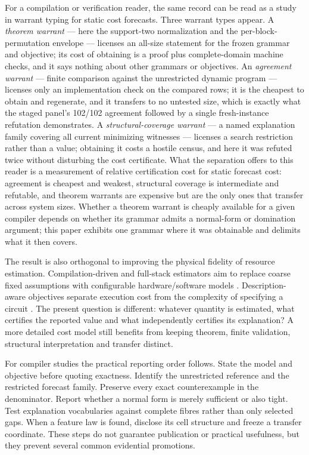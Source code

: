 For a compilation or verification reader, the same record can be read as a study in warrant typing for static cost forecasts.  Three warrant types appear.  A \emph{theorem warrant} --- here the support-two normalization and the per-block-permutation envelope --- licenses an all-size statement for the frozen grammar and objective; its cost of obtaining is a proof plus complete-domain machine checks, and it says nothing about other grammars or objectives.  An \emph{agreement warrant} --- finite comparison against the unrestricted dynamic program --- licenses only an implementation check on the compared rows; it is the cheapest to obtain and regenerate, and it transfers to no untested size, which is exactly what the staged panel's 102/102 agreement followed by a single fresh-instance refutation demonstrates.  A \emph{structural-coverage warrant} --- a named explanation family covering all current minimizing witnesses --- licenses a search restriction rather than a value; obtaining it costs a hostile census, and here it was refuted twice without disturbing the cost certificate.  What the separation offers to this reader is a measurement of relative certification cost for static forecast cost: agreement is cheapest and weakest, structural coverage is intermediate and refutable, and theorem warrants are expensive but are the only ones that transfer across system sizes.  Whether a theorem warrant is cheaply available for a given compiler depends on whether its grammar admits a normal-form or domination argument; this paper exhibits one grammar where it was obtainable and delimits what it then covers.

The result is also orthogonal to improving the physical fidelity of resource estimation.  Compilation-driven and full-stack estimators aim to replace coarse fixed assumptions with configurable hardware/software models \cite{campbell2026resourceestimation,autoqureo2026}.  Description-aware objectives separate execution cost from the complexity of specifying a circuit \cite{sarkar2026decomp2}.  The present question is different: whatever quantity is estimated, what certifies the reported value and what independently certifies its explanation?  A more detailed cost model still benefits from keeping theorem, finite validation, structural interpretation and transfer distinct.

For compiler studies the practical reporting order follows.  State the model and objective before quoting exactness.  Identify the unrestricted reference and the restricted forecast family.  Preserve every exact counterexample in the denominator.  Report whether a normal form is merely sufficient or also tight.  Test explanation vocabularies against complete fibres rather than only selected gaps.  When a feature law is found, disclose its cell structure and freeze a transfer coordinate.  These steps do not guarantee publication or practical usefulness, but they prevent several common evidential promotions.
